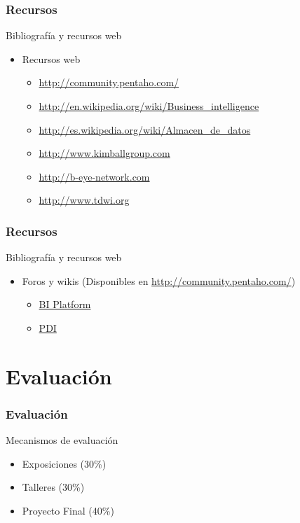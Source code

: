 \documentclass{beamer}
\begin{document}
\begin{frame}\frametitle{Recursos}
  \begin{block}{Bibliografía y recursos web}
    \begin{itemize}
      \item Recursos web
	\begin{itemize}
	  \item \href{http://community.pentaho.com/}{\url{http://community.pentaho.com/}}
	  \item \href{http://en.wikipedia.org/wiki/Business\_intelligence}{\url{http://en.wikipedia.org/wiki/Business\_intelligence}}
	  \item \href{http://es.wikipedia.org/wiki/}{\url{http://es.wikipedia.org/wiki/Almacen\_de\_datos}}
	  \item \href{http://www.kimballgroup.com}{\url{http://www.kimballgroup.com}}
	  \item \href{http://b-eye-network.com}{\url{http://b-eye-network.com}}
	  \item \href{http://www.tdwi.org}{\url{http://www.tdwi.org}}
	\end{itemize}
    \end{itemize}
  \end{block}
\end{frame}

\begin{frame}\frametitle{Recursos}
  \begin{block}{Bibliografía y recursos web}
    \begin{itemize}
      \item Foros y wikis (Disponibles en \href{http://community.pentaho.com/}{\url{http://community.pentaho.com/}})
	\begin{itemize}
	  \item \href{http://forums.pentaho.com/forumdisplay.php?73-BI-Platform}{BI Platform}
	  \item \href{http://forums.pentaho.com/forumdisplay.php?135-Pentaho-Data-Integration-Kettle}{PDI}
	\end{itemize}
    \end{itemize}
  \end{block}
\end{frame}

\section{Evaluación}
\begin{frame}\frametitle{Evaluación}
  \begin{block}{Mecanismos de evaluación}
    \begin{itemize}
      \item Exposiciones (30\%)
      \item Talleres (30\%)
      \item Proyecto Final (40\%)
    \end{itemize}
  \end{block}
\end{frame}
\end{document}
